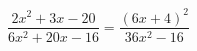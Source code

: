 \begin{ex}[type=equation]
	\begin{condition}
		$\dfrac{2x^2 + 3x -20}{6x^2 + 20x - 16} = \dfrac{(6x + 4)^2}{36x^2 - 16}$
	\end{condition}
\end{ex}
